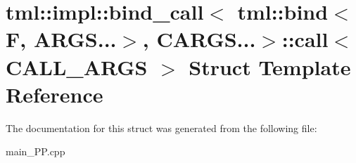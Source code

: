 \hypertarget{structtml_1_1impl_1_1bind__call_3_01tml_1_1bind_3_01F_00_01ARGS_8_8_8_4_00_01CARGS_8_8_8_4_1_1call}{\section{tml\+:\+:impl\+:\+:bind\+\_\+call$<$ tml\+:\+:bind$<$ F, A\+R\+G\+S...$>$, C\+A\+R\+G\+S...$>$\+:\+:call$<$ C\+A\+L\+L\+\_\+\+A\+R\+G\+S $>$ Struct Template Reference}
\label{structtml_1_1impl_1_1bind__call_3_01tml_1_1bind_3_01F_00_01ARGS_8_8_8_4_00_01CARGS_8_8_8_4_1_1call}
}


The documentation for this struct was generated from the following file\+:\begin{DoxyCompactItemize}
\item 
main\+\_\+\+P\+P.\+cpp\end{DoxyCompactItemize}
